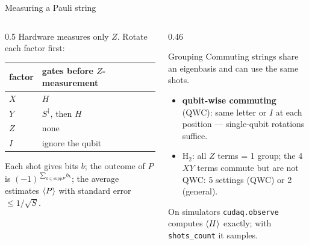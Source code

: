 \documentclass[aspectratio=169,11pt]{beamer}
\newcommand{\key}[1]{{\color{qdark}\textbf{#1}}}
\begin{document}
\begin{frame}{Measuring a Pauli string}
  \begin{columns}[T]
    \begin{column}{0.5\textwidth}
      Hardware measures only $Z$. Rotate each factor first:
      \begin{center}\small
      \begin{tabular}{ll}
        \toprule factor & gates before $Z$-measurement\\ \midrule
        $X$ & $H$\\ $Y$ & $S^\dagger$, then $H$\\ $Z$ & none\\ $I$ & ignore the qubit\\ \bottomrule
      \end{tabular}
      \end{center}
      Each shot gives bits $b$; the outcome of $P$ is $(-1)^{\sum_{k\in\mathrm{supp}P}b_k}$; the average estimates $\braket P$ with
      standard error $\le 1/\sqrt S$.
    \end{column}
    \begin{column}{0.46\textwidth}
      \begin{block}{Grouping}
        Commuting strings share an eigenbasis and can use the same shots.
        \begin{itemize}
          \item \key{qubit-wise commuting} (QWC): same letter or $I$ at each position --- single-qubit rotations suffice.
          \item H$_2$: all $Z$ terms = 1 group; the 4 $XY$ terms commute but are not QWC: 5 settings (QWC) or 2 (general).
        \end{itemize}
      \end{block}
      \small On simulators \texttt{cudaq.observe} computes $\braket H$ exactly; with \texttt{shots\_count} it samples.
    \end{column}
  \end{columns}
\end{frame}
\end{document}
